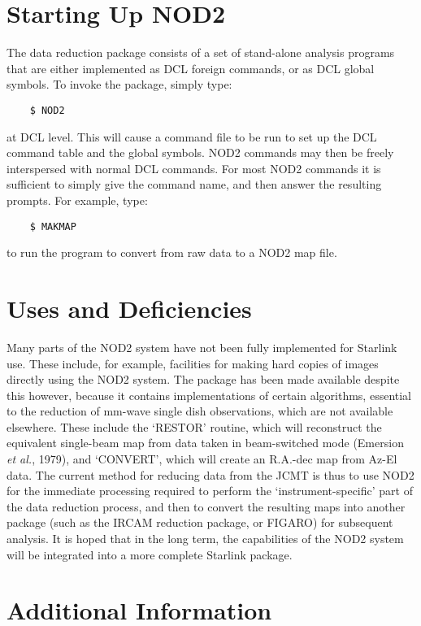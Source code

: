\section {Starting Up NOD2}

The data reduction package consists of a set of stand-alone
analysis programs that are either implemented as DCL foreign
commands, or as DCL global symbols. To invoke the package, simply
type:
\begin{verbatim}
    $ NOD2
\end{verbatim}
at DCL level. This will cause a command file to be run to set up the
DCL command table and the global symbols. NOD2 commands may then
be freely interspersed with normal DCL commands. For most NOD2 commands
it is sufficient to simply give the command name, and then answer the
resulting prompts. For example, type:
\begin{verbatim}
    $ MAKMAP
\end{verbatim}
to run the program to convert from raw data to a NOD2 map file.

\section {Uses and Deficiencies}

Many parts of the NOD2 system have not been fully implemented for Starlink
use. These include, for example, facilities for making hard copies of
images directly using the NOD2 system. The package has been made available
despite this however, because it contains implementations of certain
algorithms, essential to the reduction of mm-wave single dish observations,
which are not available elsewhere. These include the `RESTOR' routine,
which will reconstruct the equivalent single-beam map from data taken
in beam-switched mode (Emersion {\it et al.}, 1979), and
`CONVERT', which will create an R.A.-dec
map from Az-El data. The current method for reducing data from the JCMT
is thus to use NOD2 for the immediate processing required to
perform the `instrument-specific' part of the data reduction process,
and then to convert the resulting maps into another package (such as the
IRCAM reduction package, or FIGARO) for subsequent analysis. It is
hoped that in the long term, the capabilities of the NOD2 system will
be integrated into a more complete Starlink package.

\section {Additional Information}


